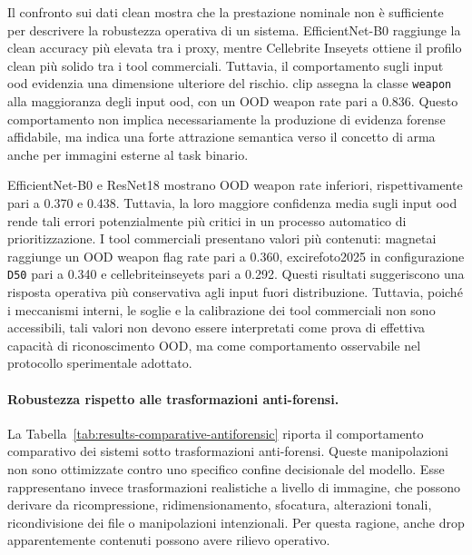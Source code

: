 Il confronto sui dati clean mostra che la prestazione nominale non è sufficiente
per descrivere la robustezza operativa di un sistema. EfficientNet-B0 raggiunge
la clean accuracy più elevata tra i proxy, mentre Cellebrite Inseyets ottiene il
profilo clean più solido tra i tool commerciali. Tuttavia, il comportamento sugli
input \gls{ood} evidenzia una dimensione ulteriore del rischio. \gls{clip}
assegna la classe \texttt{weapon} alla maggioranza degli input \gls{ood}, con un
OOD weapon rate pari a 0.836. Questo comportamento non implica necessariamente
la produzione di evidenza forense affidabile, ma indica una forte attrazione
semantica verso il concetto di arma anche per immagini esterne al task binario.

EfficientNet-B0 e ResNet18 mostrano OOD weapon rate inferiori, rispettivamente
pari a 0.370 e 0.438. Tuttavia, la loro maggiore confidenza media sugli input
\gls{ood} rende tali errori potenzialmente più critici in un processo automatico
di prioritizzazione. I tool commerciali presentano valori più contenuti:
\gls{magnetai} raggiunge un OOD weapon flag rate pari a 0.360,
\gls{excirefoto2025} in configurazione \texttt{D50} pari a 0.340 e
\gls{cellebriteinseyets} pari a 0.292. Questi risultati suggeriscono una risposta
operativa più conservativa agli input fuori distribuzione. Tuttavia, poiché i
meccanismi interni, le soglie e la calibrazione dei tool commerciali non sono
accessibili, tali valori non devono essere interpretati come prova di effettiva
capacità di riconoscimento OOD, ma come comportamento osservabile nel protocollo
sperimentale adottato.

\paragraph{Robustezza rispetto alle trasformazioni anti-forensi.}

La Tabella~\ref{tab:results-comparative-antiforensic} riporta il comportamento
comparativo dei sistemi sotto trasformazioni anti-forensi. Queste manipolazioni
non sono ottimizzate contro uno specifico confine decisionale del modello. Esse
rappresentano invece trasformazioni realistiche a livello di immagine, che possono
derivare da ricompressione, ridimensionamento, sfocatura, alterazioni tonali,
ricondivisione dei file o manipolazioni intenzionali. Per questa ragione, anche
drop apparentemente contenuti possono avere rilievo operativo.

